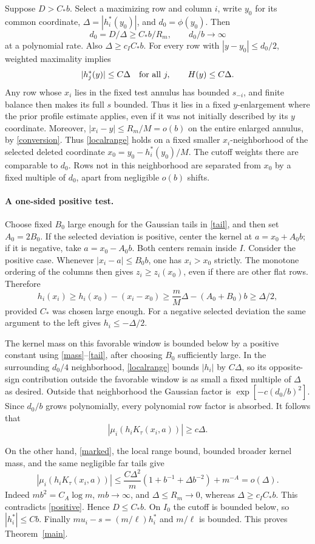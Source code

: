 \documentclass[11pt]{article}
\begin{document}
Suppose $D>C_*b$. Select a maximizing row and column $i$, write
$y_0$ for its common coordinate, $\Delta=|h_i^*(y_0)|$, and
$d_0=\phi(y_0)$. Then
\[
 d_0=D/\Delta\ge C_*b/R_m,\qquad d_0/b\longrightarrow\infty
\]
at a polynomial rate. Also $\Delta\ge c_I C_*b$.
For every row with $|y-y_0|\le d_0/2$, weighted maximality implies
\begin{equation}\label{localrange}
 |h_j^*(y)|\le C\Delta\quad\hbox{for all }j,
 \qquad H(y)\le C\Delta.
\end{equation}
Any row whose $x_i$ lies in the fixed test annulus has bounded
$s_{-i}$, and finite balance then makes its full $s$ bounded. Thus it
lies in a fixed $y$-enlargement where the prior profile estimate
applies, even if it was not initially described by its $y$ coordinate.
Moreover, $|x_i-y|\le R_m/M=o(b)$ on the entire enlarged annulus,
by \eqref{conversion}. Thus \eqref{localrange} holds on a fixed
smaller $x_i$-neighborhood of the selected deleted coordinate
$x_0=y_0-h_i^*(y_0)/M$. The cutoff weights there are comparable to
$d_0$. Rows not in this neighborhood are separated from $x_0$ by
a fixed multiple of $d_0$, apart from negligible $o(b)$ shifts.

\paragraph{A one-sided positive test.}
Choose fixed $B_0$ large enough for the Gaussian tails in
\eqref{tail}, and then set $A_0=2B_0$. If the selected deviation is
positive, center the kernel at $a=x_0+A_0b$; if it is negative,
take $a=x_0-A_0b$. Both centers remain inside $I$.
Consider the positive case. Whenever $|x_i-a|\le B_0b$, one has
$x_i>x_0$ strictly. The monotone ordering of the columns then gives
$z_i\ge z_i(x_0)$, even if there are other flat rows. Therefore
\[
 h_i(x_i)\ge h_i(x_0)-(x_i-x_0)
 \ge\frac mM\Delta-(A_0+B_0)b\ge\Delta/2,
\]
provided $C_*$ was chosen large enough. For a negative selected
deviation the same argument to the left gives $h_i\le-\Delta/2$.

The kernel mass on this favorable window is bounded below by a
positive constant using \eqref{mass}--\eqref{tail}, after choosing
$B_0$ sufficiently large. In the surrounding $d_0/4$ neighborhood,
\eqref{localrange} bounds $|h_i|$ by $C\Delta$, so its opposite-sign
contribution outside the favorable window is as small a fixed
multiple of $\Delta$ as desired. Outside that neighborhood the
Gaussian factor is $\exp[-c(d_0/b)^2]$. Since $d_0/b$ grows
polynomially, every polynomial row factor is absorbed. It follows
that
\begin{equation}\label{positive}
 |\mu_i(h_iK_\tau(x_i,a))|\ge c\Delta.
\end{equation}

On the other hand, \eqref{marked}, the local range bound, bounded
broader kernel mass, and the same negligible far tails give
\[
 |\mu_i(h_iK_\tau(x_i,a))|
 \le\frac{C\Delta^2}{m}(1+b^{-1}+\Delta b^{-2})+m^{-A}
 =o(\Delta).
\]
Indeed $mb^2=C_A\log m$, $mb\to\infty$, and
$\Delta\le R_m\to0$, whereas $\Delta\ge c_I C_*b$.
This contradicts \eqref{positive}. Hence $D\le C_*b$.
On $I_0$ the cutoff is bounded below, so $|h_i^*|\le Cb$.
Finally $m u_i-s=(m/\ell)h_i^*$ and $m/\ell$ is bounded.
This proves Theorem~\ref{main}.
\end{document}
